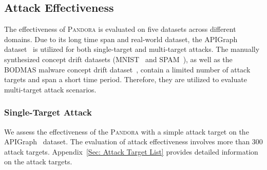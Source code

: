 \documentclass[lettersize,journal]{IEEEtran}
\newcommand{\pandora}{{\scshape Pandora}\xspace}
\begin{document}
\subsection{Attack Effectiveness}
\label{Sec: Attack Effectiveness}
The effectiveness of \pandora is evaluated on five datasets across different domains.
Due to its long time span and real-world dataset, the APIGraph dataset~\cite{2020-CCS-APIGraph} is utilized for both single-target and multi-target attacks.
The manually synthesized concept drift datasets (MNIST~\cite{2017-MINIST-dataset} and SPAM~\cite{2010-Spam-Emali-dataset}), as well as the BODMAS malware concept drift dataset~\cite{2021-PE-malware-dataset}, contain a limited number of attack targets and span a short time period.
Therefore, they are utilized to evaluate multi-target attack scenarios.

\subsubsection{Single-Target Attack} 
\label{Sec: Single Attack Targets}
We assess the effectiveness of the \pandora with a simple attack target on the APIGraph~\cite{2020-CCS-APIGraph} dataset.
The evaluation of attack effectiveness involves more than 300 attack targets.
Appendix~\ref{Sec: Attack Target List} provides detailed information on the attack targets.
\end{document}
